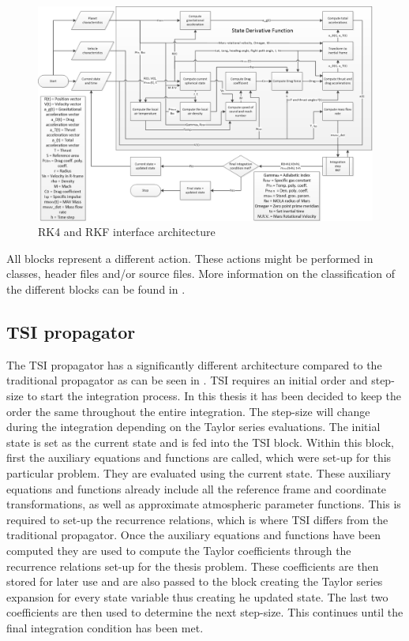 \begin{figure}[!ht]
\centering
\includegraphics[width=1.5\textwidth, angle = 90]{figures/software/RK_Propagator.png}
\caption{\ac{RK4} and \ac{RKF} interface architecture}
\label{fig:RK_Propagator}
\end{figure}

All blocks represent a different action. These actions might be performed in classes, header files and/or source files. More information on the classification of the different blocks can be found in .

\subsection{\ac{TSI} propagator}
\label{subsec:tsipropagator}
The \ac{TSI} propagator has a significantly different architecture compared to the traditional propagator as can be seen in . \ac{TSI} requires an initial order and step-size to start the integration process. In this thesis it has been decided to keep the order the same throughout the entire integration. The step-size will change during the integration depending on the Taylor series evaluations. The initial state is set as the current state and is fed into the \ac{TSI} block. Within this block, first the auxiliary equations and functions are called, which were set-up for this particular problem. They are evaluated using the current state. These auxiliary equations and functions already include all the reference frame and coordinate transformations, as well as approximate atmospheric parameter functions. This is required to set-up the recurrence relations, which is where \ac{TSI} differs from the traditional propagator. Once the auxiliary equations and functions have been computed they are used to compute the Taylor coefficients through the recurrence relations set-up for the thesis problem. These coefficients are then stored for later use and are also passed to the block creating the Taylor series expansion for every state variable thus creating he updated state. The last two coefficients are then used to determine the next step-size. This continues until the final integration condition has been met. 


